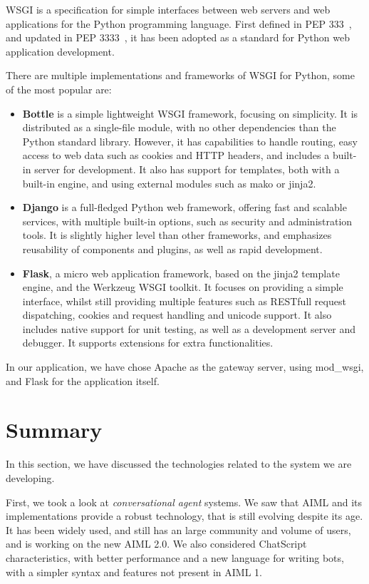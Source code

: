 \ac{WSGI} is a specification for simple interfaces between web servers and web applications for the Python programming language. First defined in PEP 333~\cite{pep0333}, and updated in PEP 3333~\cite{pep3333}, it has been adopted as a standard for Python web application development.

There are multiple implementations and frameworks of WSGI for Python, some of the most popular are:

\begin{itemize}
 \item \textbf{Bottle} is a simple lightweight WSGI framework, focusing on simplicity. It is distributed as a single-file module, with no other dependencies than the Python standard library. However, it has capabilities to handle routing, easy access to web data such as cookies and HTTP headers, and includes a built-in server for development. It also has support for templates, both with a built-in engine, and using external modules such as mako or jinja2.
 \item \textbf{Django} is a full-fledged Python web framework, offering fast and scalable services, with multiple built-in options, such as security and administration tools. It is slightly higher level than other frameworks, and emphasizes reusability of components and plugins, as well as rapid development. %
 \item \textbf{Flask}, a micro web application framework, based on the jinja2 template engine, and the Werkzeug WSGI toolkit. It focuses on providing a simple interface, whilst still providing multiple features such as RESTfull request dispatching, cookies and request handling and unicode support. It also includes native support for unit testing, as well as a development server and debugger. It supports extensions for extra functionalities.
\end{itemize}

In our application, we have chose Apache as the gateway server, using mod\_wsgi, and Flask for the application itself. 

\section{Summary}

In this section, we have discussed the technologies related to the system we are developing.

First, we took a look at \emph{conversational agent} systems. We saw that AIML and its implementations provide a robust technology, that is still evolving despite its age. It has been widely used, and still has an large community and volume of users, and is working on the new AIML 2.0. We also considered ChatScript characteristics, with better performance and a new language for writing bots, with a simpler syntax and features not present in AIML 1.

